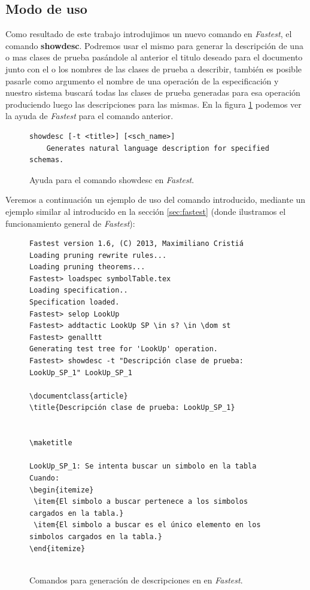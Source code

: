 \subsection{Modo de uso}

Como resultado de este trabajo introdujimos un nuevo comando en \textit{Fastest}, el comando \textbf{showdesc}. Podremos usar el mismo para generar la descripción de una o mas clases de prueba pasándole al anterior el titulo deseado para el documento junto con el o los nombres de las clases de prueba a describir, también es posible pasarle como argumento el nombre de una operación de la especificación y nuestro sistema buscará todas las clases de prueba generadas para esa operación produciendo luego las descripciones para las mismas. En la figura \ref{ej:showdesc_fastest} podemos ver la ayuda de \textit{Fastest} para el comando anterior.

\begin{figure}[H]
\begin{Verbatim}[frame=single,fontsize=\scriptsize]
showdesc [-t <title>] [<sch_name>]
	Generates natural language description for specified schemas.
\end{Verbatim}
\caption{Ayuda para el comando showdesc en \emph{Fastest}.}
\label{ej:showdesc_fastest}
\end{figure}

Veremos a continuación un ejemplo de uso del comando introducido, mediante un ejemplo similar al introducido en la sección \ref{sec:fastest} (donde ilustramos el funcionamiento general de \textit{Fastest}):

\begin{figure}[H]
\begin{Verbatim}[frame=single,fontsize=\scriptsize]
Fastest version 1.6, (C) 2013, Maximiliano Cristiá
Loading pruning rewrite rules...
Loading pruning theorems...
Fastest> loadspec symbolTable.tex
Loading specification..
Specification loaded.
Fastest> selop LookUp
Fastest> addtactic LookUp SP \in s? \in \dom st      
Fastest> genalltt
Generating test tree for 'LookUp' operation.
Fastest> showdesc -t "Descripción clase de prueba: LookUp_SP_1" LookUp_SP_1 

\documentclass{article}
\title{Descripción clase de prueba: LookUp_SP_1}


\maketitle

LookUp_SP_1: Se intenta buscar un simbolo en la tabla
Cuando:
\begin{itemize}
 \item{El simbolo a buscar pertenece a los simbolos cargados en la tabla.}
 \item{El simbolo a buscar es el único elemento en los simbolos cargados en la tabla.}
\end{itemize}


\end{Verbatim}
\caption{Comandos para generación de descripciones en en \emph{Fastest}.}
\label{ej:comandos_fastest_nlg}
\end{figure}

